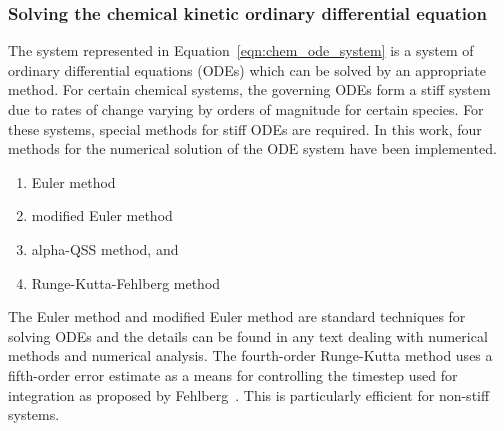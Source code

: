 \subsubsection{Solving the chemical kinetic ordinary differential equation}
%
The system represented in Equation~\ref{eqn:chem_ode_system} is a system of ordinary
differential equations (ODEs) which can be solved by
an appropriate method.
For certain chemical systems, the governing ODEs form a stiff system
due to rates of change varying by orders of magnitude for certain
species.
For these systems, special methods for stiff ODEs are required.
In this work, four methods for the numerical solution of the ODE system
have been implemented.
\begin{enumerate}
  \item Euler method
  \item modified Euler method
  \item alpha-QSS method, and
  \item Runge-Kutta-Fehlberg method
\end{enumerate}

\medskip
The Euler method and modified Euler method are standard techniques for solving
ODEs and the details can be found in any text dealing with numerical methods and
numerical analysis.
The fourth-order Runge-Kutta method uses a fifth-order error estimate as a means for controlling
the timestep used for integration as proposed by Fehlberg~\cite{fehlberg_69}.
This is particularly efficient for non-stiff systems.

